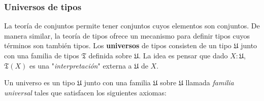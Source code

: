 \documentclass{article}
\begin{document}
    \subsubsection{Universos de tipos}
        La teoría de conjuntos permite tener conjuntos cuyos elementos son 
        conjuntos. De manera similar, la teoría de tipos ofrece un mecanismo
        para definir tipos cuyos términos son también tipos. Los 
        \textbf{universos} de tipos consisten de un tipo $\mathfrak{U}$ junto
        con una familia de tipos $\mathfrak{T}$ definida sobre $\mathfrak{U}$.
        La idea es pensar que dado $X : \mathfrak{U}$, $\mathfrak{T}(X)$ es
        una "\textit{interpretación}" externa a $\mathfrak{U}$ de $X$.
        \begin{definition}[Universo]
            Un universo es un tipo $\mathfrak{U}$ junto con una familia
            $\mathfrak{U}$ sobre $\mathfrak{U}$ llamada 
            \textit{familia universal} tales que satisfacen los siguientes
            axiomas:


\end{definition}
\end{document}
